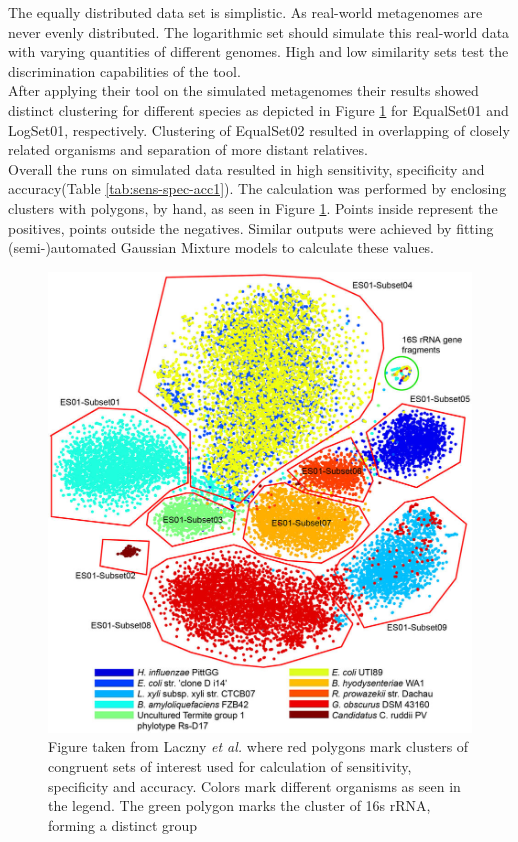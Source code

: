 \documentclass[twocolumn]{bmcart}%
\begin{document}
The equally distributed data set is simplistic. As real-world metagenomes are never evenly distributed. The logarithmic set should simulate this real-world data with varying quantities of different genomes. High and low similarity sets test the discrimination capabilities of the tool.\\
After applying their tool on the simulated metagenomes their results showed distinct clustering for different species as depicted in Figure \ref{img:clusterData1} for EqualSet01 and LogSet01, respectively. Clustering of EqualSet02 resulted in overlapping of closely related organisms and separation of more distant relatives. \\
Overall the runs on simulated data resulted in high sensitivity, specificity and accuracy(Table \ref{tab:sens-spec-acc1}). The calculation was performed by enclosing clusters with polygons, by hand, as seen in Figure \ref{img:clusterData1}. Points inside represent the positives, points outside the negatives. Similar outputs were achieved by fitting (semi-)automated Gaussian Mixture models to calculate these values.
\begin{figure}[p]
	\centering
	\includegraphics[width=.98\linewidth]{bilder/clusterData1.jpg}
	\caption{Figure taken from Laczny \textit{et al.} \cite{Laczny2014} where red polygons mark clusters of congruent sets of interest used for calculation of sensitivity, specificity and accuracy. Colors mark different organisms as seen in the legend. The green polygon marks the cluster of 16s rRNA, forming a distinct group}
	\label{img:clusterData1}
\end{figure}%
\end{document}
